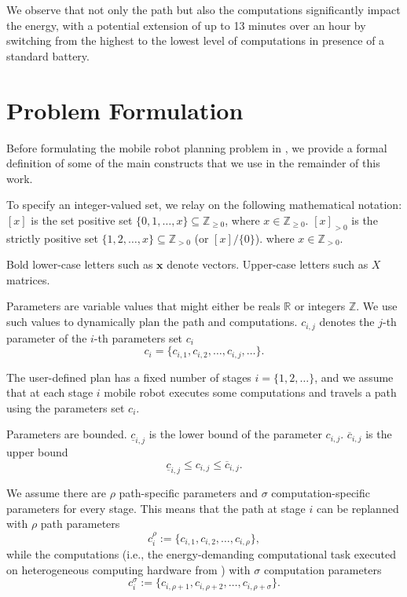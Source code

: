 We observe that not only the path but also the computations significantly impact the energy, with a potential extension of up to 13 minutes over an hour by switching from the highest to the lowest level of computations in presence of a standard battery.


\section{Problem Formulation}
\label{sec:pb-form}

Before formulating the mobile robot planning problem in , we provide a formal definition of some of the main constructs that we use in the remainder of this work.

To specify an integer-valued set, we relay on the following mathematical notation: $[x]$ is the set positive set $\{0,1,\dots,x\}\subseteq\mathbb{Z}_{\geq 0}$, where $x\in\mathbb{Z}_{\geq 0}$. $[x]_{>0}$ is the strictly positive set $\{1,2,\dots,x\}\subseteq\mathbb{Z}_{> 0}$ (or $[x]/\{0\}$). where $x\in\mathbb{Z}_{>0}$. 

Bold lower-case letters such as $\mathbf{x}$ denote vectors. Upper-case letters such as $X$ matrices.

Parameters are variable values that might either be reals $\mathbb{R}$ or integers $\mathbb{Z}$. We use such values to dynamically plan the path and computations. $c_{i,j}$ denotes the $j$-th parameter of the $i$-th parameters set $c_i$
\begin{equation}
  c_i=\{c_{i,1},c_{i,2},\dots,c_{i,j},\dots\}.
\end{equation}

The user-defined plan has a fixed number of stages $i=\{1,2,\dots\}$, and we assume that at each stage $i$ mobile robot executes some computations and travels a path using the parameters set $c_i$.

Parameters are bounded. $\underline{c}_{i,j}$ is the lower bound of the parameter $c_{i,j}$. $\overline{c}_{i,j}$ is the upper bound
\begin{equation}
  \underline{c}_{i,j}\leq c_{i,j}\leq\overline{c}_{i,j}.
\end{equation}

We assume there are $\rho$ path-specific parameters and $\sigma$ computation-specific parameters for every stage. This means that the path at stage $i$ can be replanned with $\rho$ path parameters
\begin{equation}\label{eq:path-params}
    c_i^\rho:=\{c_{i,1},c_{i,2},\dots,c_{i,\rho}\},
\end{equation}
while the computations (i.e., the energy-demanding computational task executed on heterogeneous computing hardware from ) with $\sigma$ computation parameters 
\begin{equation}\label{eq:comp-params}
    c_i^\sigma:=\{c_{i,\rho+1},c_{i,\rho+2},\dots,c_{i,\rho+\sigma}\}.
\end{equation}

